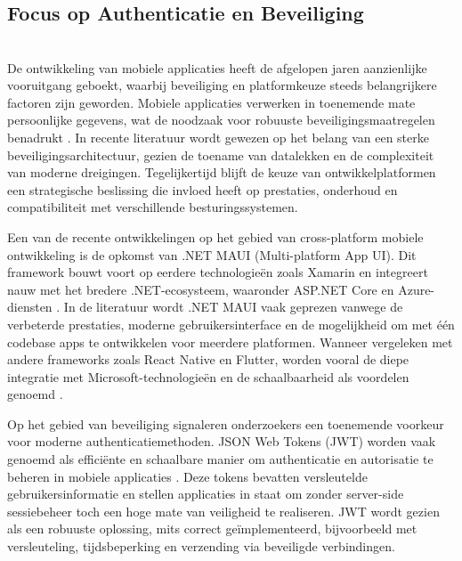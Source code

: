 \chapter{}%
\label{ch:stand-van-zaken}


\section{Focus op Authenticatie en Beveiliging}\\

De ontwikkeling van mobiele applicaties heeft de afgelopen jaren aanzienlijke vooruitgang geboekt, waarbij beveiliging en platformkeuze steeds belangrijkere factoren zijn geworden. Mobiele applicaties verwerken in toenemende mate persoonlijke gegevens, wat de noodzaak voor robuuste beveiligingsmaatregelen benadrukt \autocite{build382022}. In recente literatuur wordt gewezen op het belang van een sterke beveiligingsarchitectuur, gezien de toename van datalekken en de complexiteit van moderne dreigingen. Tegelijkertijd blijft de keuze van ontwikkelplatformen een strategische beslissing die invloed heeft op prestaties, onderhoud en compatibiliteit met verschillende besturingssystemen.

Een van de recente ontwikkelingen op het gebied van cross-platform mobiele ontwikkeling is de opkomst van .NET MAUI (Multi-platform App UI). Dit framework bouwt voort op eerdere technologieën zoals Xamarin en integreert nauw met het bredere .NET-ecosysteem, waaronder ASP.NET Core en Azure-diensten \autocite{Klesman2023}. In de literatuur wordt .NET MAUI vaak geprezen vanwege de verbeterde prestaties, moderne gebruikersinterface en de mogelijkheid om met één codebase apps te ontwikkelen voor meerdere platformen. Wanneer vergeleken met andere frameworks zoals React Native en Flutter, worden vooral de diepe integratie met Microsoft-technologieën en de schaalbaarheid als voordelen genoemd \autocite{Kuppan2024}.

Op het gebied van beveiliging signaleren onderzoekers een toenemende voorkeur voor moderne authenticatiemethoden. JSON Web Tokens (JWT) worden vaak genoemd als efficiënte en schaalbare manier om authenticatie en autorisatie te beheren in mobiele applicaties \autocite{Gao2023}. Deze tokens bevatten versleutelde gebruikersinformatie en stellen applicaties in staat om zonder server-side sessiebeheer toch een hoge mate van veiligheid te realiseren. JWT wordt gezien als een robuuste oplossing, mits correct geïmplementeerd, bijvoorbeeld met versleuteling, tijdsbeperking en verzending via beveiligde verbindingen.

